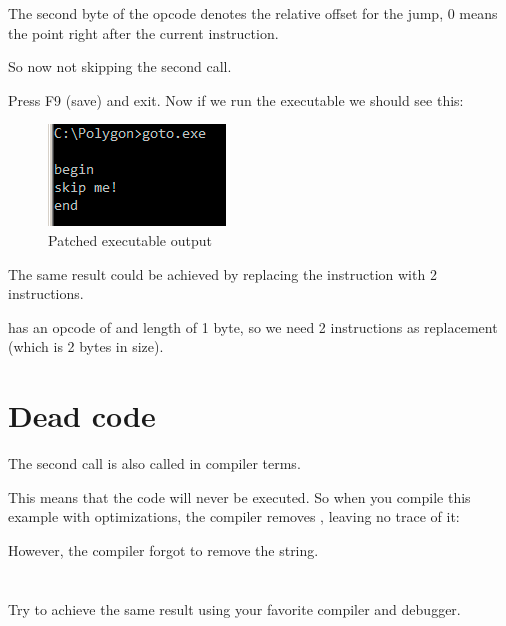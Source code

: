 The second byte of the \JMP opcode denotes the relative offset for the jump, 0 means the point
right after the current instruction.

So now \JMP not skipping the second \printf call.

Press F9 (save) and exit.  Now if we run the executable we should see this:

\begin{figure}[H]
\centering
\includegraphics[scale=\NormalScale]{patterns/065_GOTO/result.png}
\caption{Patched executable output}
\label{fig:goto_result}
\end{figure}

The same result could be achieved by replacing the \JMP instruction with 2 \NOP instructions.

\NOP has an opcode of  and length of 1 byte, so we need 2 instructions as \JMP replacement (which is 2 bytes in size).

\section{Dead code}

The second \printf call is also called  in compiler terms.

This means that the code will never be executed.
So when you compile this example with optimizations, the compiler removes , leaving
no trace of it:



However, the compiler forgot to remove the  string.


\section{\Exercise}


Try to achieve the same result using your favorite compiler and debugger.


